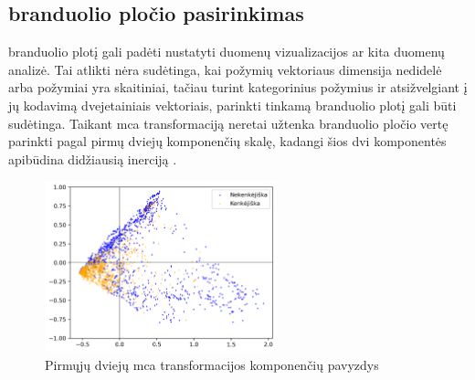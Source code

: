 \clearpage
\subsection{\LIME branduolio pločio pasirinkimas}
\LIME branduolio plotį  gali padėti nustatyti duomenų vizualizacijos ar kita duomenų analizė. Tai atlikti nėra sudėtinga, kai požymių vektoriaus dimensija nedidelė arba požymiai yra skaitiniai, tačiau turint kategorinius požymius ir atsižvelgiant į jų kodavimą dvejetainiais vektoriais, parinkti tinkamą \LIME branduolio plotį gali būti sudėtinga. Taikant \gls{mca} transformaciją neretai užtenka branduolio pločio vertę parinkti pagal pirmų dviejų komponenčių skalę, kadangi šios dvi komponentės apibūdina didžiausią inerciją .
\vspace{5cm}
\begin{figure}[h]
        \centering
        \includegraphics[width=0.6\textwidth]{images/mca_scatter.png}
        \caption{Pirmųjų dviejų \gls{mca} transformacijos komponenčių pavyzdys}
        \label{fig:scree}
\end{figure}

